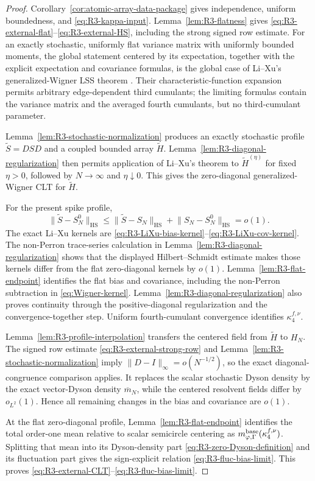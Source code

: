 \documentclass[11pt]{article}
\theoremstyle{definition}
\theoremstyle{remark}
\newcommand{\HS}{\mathrm{HS}}
\newcommand{\norm}[1]{\lVert #1\rVert}
\begin{document}
\begin{proof}
Corollary~\ref{cor:atomic-array-data-package} gives independence, uniform
boundedness, and \eqref{eq:R3-kappa-input}.  Lemma~\ref{lem:R3-flatness}
gives \eqref{eq:R3-external-flat}--\eqref{eq:R3-external-HS}, including the
strong signed row estimate.  For an exactly stochastic, uniformly flat
variance matrix with uniformly bounded moments, the global statement centered
by its expectation, together with the explicit expectation and covariance
formulas, is the global case of Li--Xu's generalized-Wigner LSS theorem
\cite[Theorem~2.2]{LiXu2021GeneralizedWignerLES}.  Their
characteristic-function expansion permits arbitrary edge-dependent third
cumulants; the limiting formulas contain the variance matrix and the averaged
fourth cumulants, but no third-cumulant parameter.

Lemma~\ref{lem:R3-stochastic-normalization} produces an exactly stochastic
profile \(\widetilde S=DSD\) and a coupled bounded array \(\widetilde H\).
Lemma~\ref{lem:R3-diagonal-regularization} then permits application of
Li--Xu's theorem to \(\widetilde H^{(\eta)}\) for fixed \(\eta>0\), followed by
\(N\to\infty\) and \(\eta\downarrow0\).  This gives the zero-diagonal
generalized-Wigner CLT for \(\widetilde H\).

For the present spike profile,
\[
 \norm{\widetilde S-S_N^0}_{\HS}
 \le\norm{\widetilde S-S_N}_{\HS}
   +\norm{S_N-S_N^0}_{\HS}=o(1).
\]
The exact Li--Xu kernels are
\eqref{eq:R3-LiXu-bias-kernel}--\eqref{eq:R3-LiXu-cov-kernel}.  The
non-Perron trace-series calculation in
Lemma~\ref{lem:R3-diagonal-regularization} shows that the displayed
Hilbert--Schmidt estimate makes those kernels differ from the flat
zero-diagonal kernels by \(o(1)\).  Lemma~\ref{lem:R3-flat-endpoint} identifies
the flat bias and covariance, including the non-Perron subtraction in
\eqref{eq:Wigner-kernel}.  Lemma~\ref{lem:R3-diagonal-regularization} also
proves continuity through the positive-diagonal regularization and the
convergence-together step.  Uniform fourth-cumulant convergence identifies
\(\kappa_4^{f,\nu}\).

Lemma~\ref{lem:R3-profile-interpolation} transfers the centered field from
\(\widetilde H\) to \(H_N\).  The signed row estimate
\eqref{eq:R3-external-strong-row} and
Lemma~\ref{lem:R3-stochastic-normalization} imply
\(\lVert D-I\rVert_\infty=o(N^{-1/2})\), so the exact diagonal-congruence
comparison applies.  It replaces the scalar stochastic Dyson density by the
exact vector-Dyson density \(\overline m_N\), while the centered resolvent
fields differ by \(o_{L^2}(1)\).  Hence all remaining changes in the bias and
covariance are \(o(1)\).

At the flat zero-diagonal profile, Lemma~\ref{lem:R3-flat-endpoint} identifies
the total order-one mean relative to scalar semicircle centering as
\(m_{\varphi,\Gamma}^{\rm base}(\kappa_4^{f,\nu})\).  Splitting that mean into its
Dyson-density part \eqref{eq:R3-zero-Dyson-definition} and its fluctuation
part gives the sign-explicit relation \eqref{eq:R3-fluc-bias-limit}.  This
proves \eqref{eq:R3-external-CLT}--\eqref{eq:R3-fluc-bias-limit}.
\end{proof}
\end{document}
